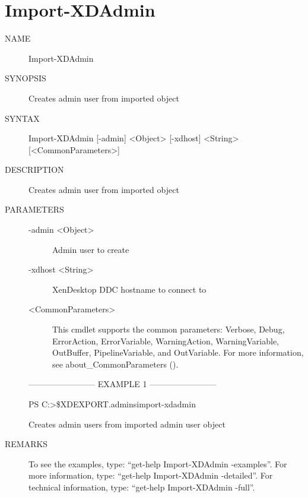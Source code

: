 \documentclass[letterpaper,10pt,english]{sphinxmanual}
\begin{document}
\section{Import-XDAdmin}
\label{\detokenize{cmd_import:import-xdadmin}}\begin{description}
\item[{NAME}] \leavevmode
Import-XDAdmin

\item[{SYNOPSIS}] \leavevmode
Creates admin user from imported object

\item[{SYNTAX}] \leavevmode
Import-XDAdmin {[}-admin{]} \textless{}Object\textgreater{} {[}-xdhost{]} \textless{}String\textgreater{} {[}\textless{}CommonParameters\textgreater{}{]}

\item[{DESCRIPTION}] \leavevmode
Creates admin user from imported object

\item[{PARAMETERS}] \leavevmode\begin{description}
\item[{-admin \textless{}Object\textgreater{}}] \leavevmode
Admin user to create

\item[{-xdhost \textless{}String\textgreater{}}] \leavevmode
XenDesktop DDC hostname to connect to

\item[{\textless{}CommonParameters\textgreater{}}] \leavevmode
This cmdlet supports the common parameters: Verbose, Debug,
ErrorAction, ErrorVariable, WarningAction, WarningVariable,
OutBuffer, PipelineVariable, and OutVariable. For more information, see
about\_CommonParameters ().

\end{description}

————————\textendash{} EXAMPLE 1 ————————\textendash{}

PS C:\textgreater{}\$XDEXPORT.admins\textbar{}import-xdadmin

Creates admin users from imported admin user object

\item[{REMARKS}] \leavevmode
To see the examples, type: “get-help Import-XDAdmin -examples”.
For more information, type: “get-help Import-XDAdmin -detailed”.
For technical information, type: “get-help Import-XDAdmin -full”.

\end{description}
\end{document}
